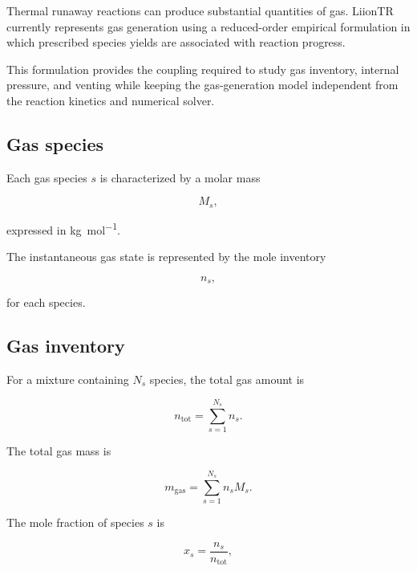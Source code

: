 Thermal runaway reactions can produce substantial quantities of gas.
LiionTR currently represents gas generation using a reduced-order
empirical formulation in which prescribed species yields are associated
with reaction progress.

This formulation provides the coupling required to study gas inventory,
internal pressure, and venting while keeping the gas-generation model
independent from the reaction kinetics and numerical solver.


\subsection{Gas species}

Each gas species $s$ is characterized by a molar mass

\begin{equation}
    M_s,
\end{equation}

expressed in \si{\kilogram\per\mole}.

The instantaneous gas state is represented by the mole inventory

\begin{equation}
    n_s,
\end{equation}

for each species.


\subsection{Gas inventory}

For a mixture containing $N_s$ species, the total gas amount is

\begin{equation}
    n_{\mathrm{tot}}
    =
    \sum_{s=1}^{N_s}
    n_s.
    \label{eq:gas_total_moles}
\end{equation}

The total gas mass is

\begin{equation}
    m_{\mathrm{gas}}
    =
    \sum_{s=1}^{N_s}
    n_s M_s.
    \label{eq:gas_total_mass}
\end{equation}

The mole fraction of species $s$ is

\begin{equation}
    x_s
    =
    \frac{
        n_s
    }{
        n_{\mathrm{tot}}
    },
    \label{eq:gas_mole_fraction}
\end{equation}

